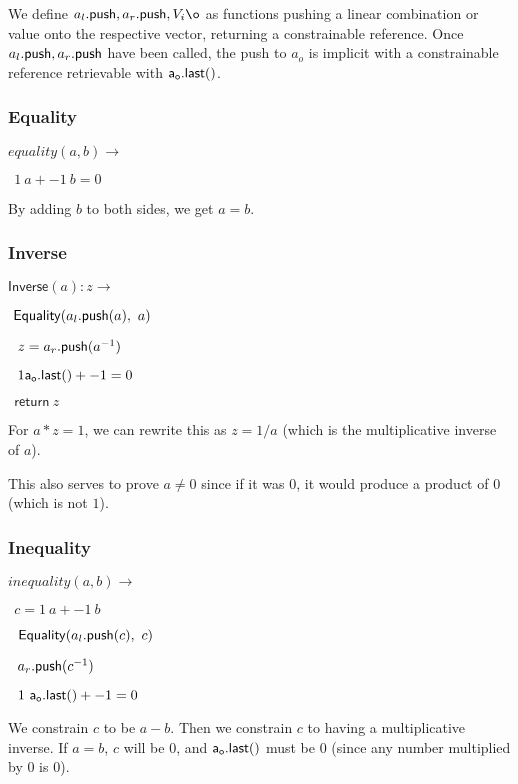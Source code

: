 \documentclass[]{article}
\begin{document}
We define $\al, \ar, V_i\o$ as functions pushing a linear combination or value onto the respective vector, returning a constrainable reference. Once $a_l\mathsf{.push}, a_r\mathsf{.push}$ have been called, the push to $a_o$ is implicit with a constrainable reference retrievable with $\mathsf{a_o.last()}$.

\newcommand{\all}{\mathsf{a_l.last()}}
\newcommand{\arl}{\mathsf{a_r.last()}}

\subsubsection{Equality}

\newcommand{\equality}{\mathsf{Equality}}

$equality(a, b) \rightarrow$

$~~1 ~a + -1 ~b = 0$

By adding $b$ to both sides, we get $a = b$.

\subsubsection{Inverse}

\newcommand{\inverse}{\mathsf{Inverse}}

$\inverse(a): z \rightarrow$

$~\equality(\al(a), ~a)$

$~~z = a_r\mathsf{.push}(a^{-1})$

$~~1 \mathsf{a_o.last()} + -1 = 0$

$~~\mathsf{return} ~z$

For $a * z = 1$, we can rewrite this as $z = 1/a$ (which is the multiplicative inverse of $a$).

This also serves to prove $a \ne 0$ since if it was $0$, it would produce a product of $0$ (which is not $1$).

\subsubsection{Inequality}

\newcommand{\inequality}{\mathsf{Inequality}}

$inequality(a, b) \rightarrow$

$~~c = 1 ~a + -1 ~b$

$~~\equality(\al(c), ~c)$

$~~a_r\mathsf{.push}(c^{-1})$

$~~1 ~\mathsf{a_o.last()} + -1 = 0$

We constrain $c$ to be $a - b$. Then we constrain $c$ to having a multiplicative inverse. If $a = b$, $c$ will be $0$, and $\mathsf{a_o.last()}$ must be $0$ (since any number multiplied by $0$ is $0$).
\end{document}
